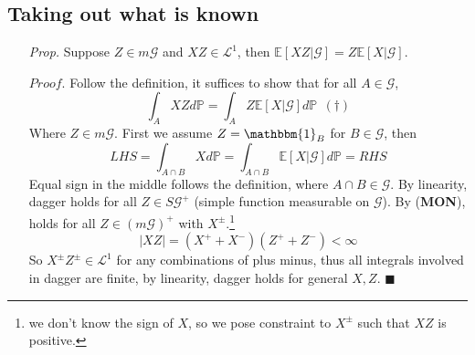 \documentclass[a4paper,12pt,twoside]{book}
\begin{document}
\subsection{Taking out what is known}
\begin{itemize}
	\item[\textit{Prop.}] Suppose $Z\in m \mathcal{G}$ and $XZ \in \mathcal{L}^1$, then $\mathbb{E}\left[XZ|\mathcal{G}\right]=Z\mathbb{E}\left[X|\mathcal{G}\right]$.
	\item[$Proof.$] Follow the definition, it suffices to show that for all $A\in \mathcal{G}$, 
	\begin{equation}
		\int_A XZ d\mathbb{P} = \int_A Z \mathbb{E}\left[X|\mathcal{G}\right] d\mathbb{P}~~(\dagger)
	\end{equation}
	Where $Z \in m \mathcal{G}$. First we assume $Z= \mathbbm{1}_{B}$ for $B\in \mathcal{G}$, then
	\begin{equation}
		LHS = \int_{A\cap B} X d\mathbb{P} = \int_{A\cap B} \mathbb{E}\left[X|\mathcal{G}\right] d\mathbb{P} = RHS
	\end{equation}
	Equal sign in the middle follows the definition, where $A\cap B\in \mathcal{G}$.\newline
	By linearity, dagger holds for all $Z\in S \mathcal{G}^+$ (simple function measurable on $\mathcal{G}$). \newline
	By (\textbf{MON}), holds for all $Z \in (m \mathcal{G})^+$ with $X^{\pm}$.\footnote{we don't know the sign of $X$, so we pose constraint to $X^{\pm}$ such that $XZ$ is positive.}
	\begin{equation}
		|XZ| = (X^++X^-)(Z^++Z^-) <\infty
	\end{equation}
	So $X^{\pm}Z^{\pm} \in \mathcal{L}^1$ for any combinations of plus minus, thus all integrals involved in dagger are finite, by linearity, dagger holds for general $X,Z$. $\blacksquare$
\end{itemize}

\end{document}

